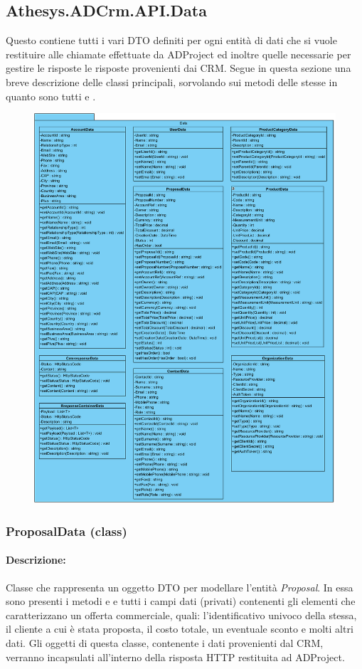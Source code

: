 \subsection{Athesys.ADCrm.API.Data}
Questo  contiene tutti i vari DTO definiti per ogni entità di dati che si vuole restituire alle chiamate effettuate da ADProject ed inoltre quelle necessarie per gestire le risposte le risposte provenienti dai CRM. 
Segue in questa sezione una breve descrizione delle classi principali, sorvolando sui metodi delle stesse in quanto sono tutti   e .
\begin{figure}[H]
	\centering
	\includegraphics[width=\linewidth]{images/modules/Data}
	\caption{}
	\label{fig:data}
\end{figure}

\subsubsection{ProposalData (class)}
\paragraph{Descrizione:}
Classe che rappresenta un oggetto DTO per modellare l'entità \textit{Proposal}.
In essa sono presenti i metodi  e  e tutti i campi dati (privati) contenenti gli elementi che caratterizzano un offerta commerciale, quali: l'identificativo univoco della stessa, il cliente a cui è stata proposta, il costo totale, un eventuale sconto e molti altri dati.
Gli oggetti di questa classe, contenente i dati provenienti dal CRM, verranno incapsulati all'interno della risposta HTTP restituita ad ADProject.

